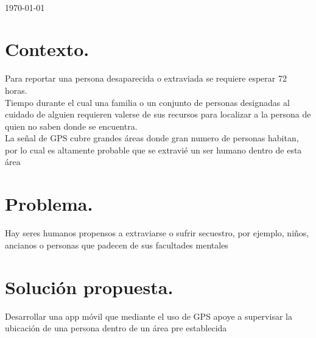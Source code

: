 \documentclass[10pt]{article}
\begin{document}
\begin{center}
        \\                                                                     %
\vspace{2cm}                                                                                
\begin{center}                                                                                  
{\large \today}                                                                 %
            \end{center}                                                                        
\end{center}                                                                        
                                                                                    
\newpage                                                                        

\tableofcontents 

\newpage



\section{Contexto.}
Para reportar una persona desaparecida o extraviada se requiere esperar 72 horas. \\

Tiempo durante el cual una familia o un conjunto de personas designadas al cuidado de alguien requieren valerse de sus recursos para localizar a la persona de quien no saben donde se encuentra. \\

La señal de GPS cubre grandes áreas donde gran numero de personas habitan, por lo cual es altamente probable que se extravié un ser humano dentro de esta área   
 


\section{Problema.}
Hay seres humanos propensos a extraviarse o sufrir secuestro, por ejemplo, niños, ancianos o personas que padecen de sus facultades mentales

\section{Solución propuesta.}
Desarrollar una app móvil que mediante el uso de GPS apoye a supervisar la ubicación de una persona dentro de un área pre establecida  
\end{document}
